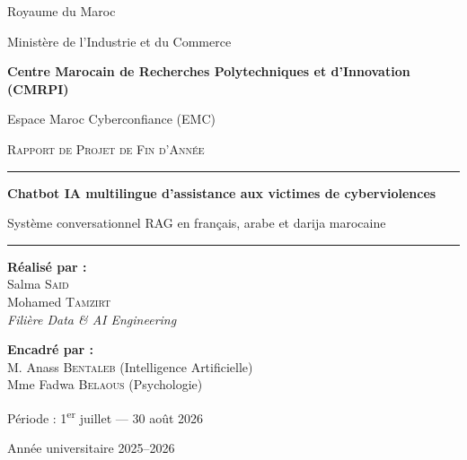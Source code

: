 \documentclass[a4paper,11pt,twoside]{report}
\begin{document}
\begin{titlepage}
\centering
\vspace*{1.2cm}
{\large Royaume du Maroc \par}
{\large Ministère de l'Industrie et du Commerce \par}
\vspace{0.4cm}
{\large\bfseries Centre Marocain de Recherches Polytechniques et d'Innovation (CMRPI)\par}
{\large Espace Maroc Cyberconfiance (EMC)\par}

\vspace{1.6cm}
{\Large\scshape Rapport de Projet de Fin d'Année\par}
\vspace{0.8cm}
\rule{\linewidth}{0.6pt}\par\vspace{0.5cm}
{\huge\bfseries\color{emcnavy} Chatbot IA multilingue d'assistance aux victimes de cyberviolences\par}
\vspace{0.4cm}
{\Large\color{emcgray} Système conversationnel RAG en français, arabe et darija marocaine\par}
\vspace{0.5cm}\rule{\linewidth}{0.6pt}

\vspace{1.4cm}
\begin{minipage}{0.46\textwidth}
\begin{flushleft}
\textbf{Réalisé par :}\\[0.25cm]
Salma \textsc{Said}\\
Mohamed \textsc{Tamzirt}\\[0.2cm]
\small\itshape Filière Data \& AI Engineering
\end{flushleft}
\end{minipage}\hfill
\begin{minipage}{0.46\textwidth}
\begin{flushright}
\textbf{Encadré par :}\\[0.25cm]
M. Anass \textsc{Bentaleb} \small(Intelligence Artificielle)\normalsize\\
Mme Fadwa \textsc{Belaous} \small(Psychologie)\normalsize
\end{flushright}
\end{minipage}

\vfill
{\large Période : 1\textsuperscript{er} juillet — 30 août 2026\par}
\vspace{0.3cm}
{\large Année universitaire 2025--2026\par}
\end{titlepage}
\end{document}
